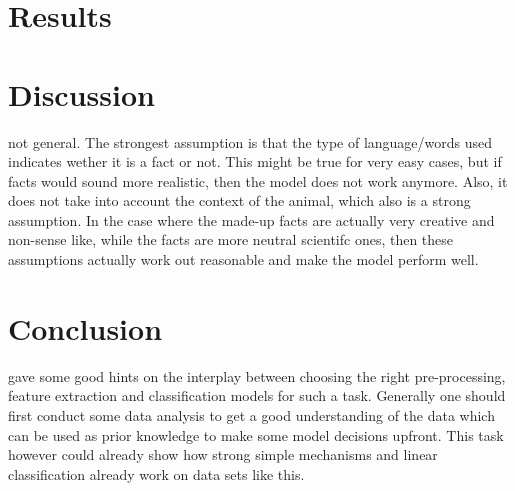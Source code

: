 \documentclass[12pt]{article}
\begin{document}
\section{Results}




\section{Discussion}




not general. The strongest assumption is that the type of language/words used indicates wether it is a fact or not. This might be true for very easy cases, but if facts would sound more realistic, then the model does not work anymore. Also, it does not take into account the context of the animal, which also is a strong assumption. In the case where the made-up facts are actually very creative and non-sense like, while the facts are more neutral scientifc ones, then these assumptions actually work out reasonable and make the model perform well.

\section{Conclusion}
gave some good hints on the interplay between choosing the right pre-processing, feature extraction and classification models for such a task. Generally one should first conduct some data analysis to get a good understanding of the data which can be used as prior knowledge to make some model decisions upfront. This task however could already show how strong simple mechanisms and linear classification already work on data sets like this.



\end{document}
